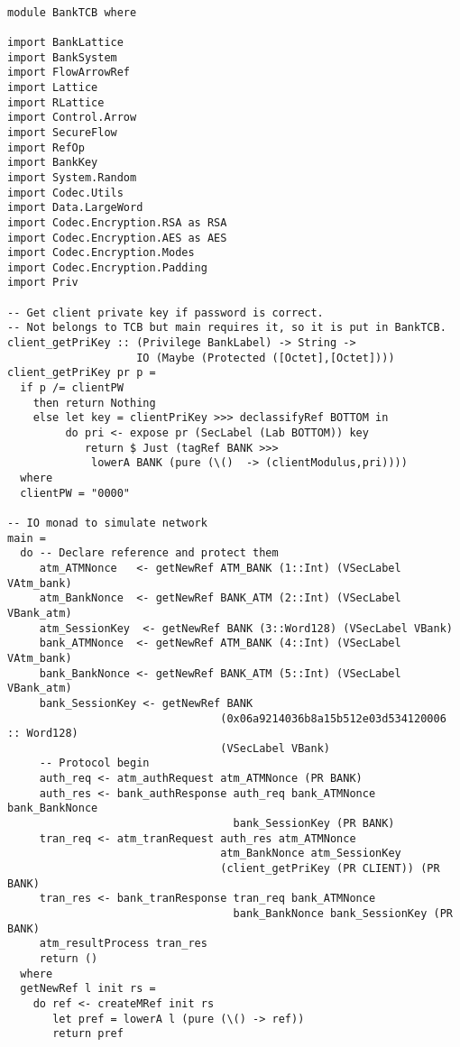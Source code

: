 \begin{Verbatim}[fontsize=\footnotesize,frame=lines,
                 framesep=5mm, label={[BankTCB.hs]BankTCB.hs}]

module BankTCB where

import BankLattice
import BankSystem
import FlowArrowRef
import Lattice
import RLattice
import Control.Arrow
import SecureFlow
import RefOp
import BankKey
import System.Random
import Codec.Utils
import Data.LargeWord
import Codec.Encryption.RSA as RSA
import Codec.Encryption.AES as AES
import Codec.Encryption.Modes
import Codec.Encryption.Padding
import Priv

-- Get client private key if password is correct.
-- Not belongs to TCB but main requires it, so it is put in BankTCB.
client_getPriKey :: (Privilege BankLabel) -> String -> 
                    IO (Maybe (Protected ([Octet],[Octet])))
client_getPriKey pr p =
  if p /= clientPW
    then return Nothing
    else let key = clientPriKey >>> declassifyRef BOTTOM in
         do pri <- expose pr (SecLabel (Lab BOTTOM)) key
            return $ Just (tagRef BANK >>> 
             lowerA BANK (pure (\()  -> (clientModulus,pri))))
  where
  clientPW = "0000"

-- IO monad to simulate network
main =
  do -- Declare reference and protect them
     atm_ATMNonce   <- getNewRef ATM_BANK (1::Int) (VSecLabel VAtm_bank)
     atm_BankNonce  <- getNewRef BANK_ATM (2::Int) (VSecLabel VBank_atm)
     atm_SessionKey  <- getNewRef BANK (3::Word128) (VSecLabel VBank)
     bank_ATMNonce  <- getNewRef ATM_BANK (4::Int) (VSecLabel VAtm_bank) 
     bank_BankNonce <- getNewRef BANK_ATM (5::Int) (VSecLabel VBank_atm)
     bank_SessionKey <- getNewRef BANK 
                                 (0x06a9214036b8a15b512e03d534120006 :: Word128) 
                                 (VSecLabel VBank)
     -- Protocol begin
     auth_req <- atm_authRequest atm_ATMNonce (PR BANK)
     auth_res <- bank_authResponse auth_req bank_ATMNonce bank_BankNonce 
                                   bank_SessionKey (PR BANK)
     tran_req <- atm_tranRequest auth_res atm_ATMNonce 
                                 atm_BankNonce atm_SessionKey
                                 (client_getPriKey (PR CLIENT)) (PR BANK)
     tran_res <- bank_tranResponse tran_req bank_ATMNonce 
                                   bank_BankNonce bank_SessionKey (PR BANK)
     atm_resultProcess tran_res
     return ()
  where
  getNewRef l init rs =
    do ref <- createMRef init rs
       let pref = lowerA l (pure (\() -> ref))
       return pref
\end{Verbatim}
